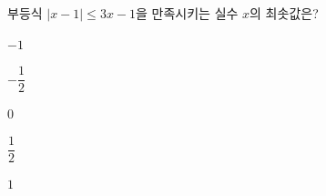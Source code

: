 부등식 $|x-1|\le 3x-1$을 만족시키는 실수 $x$의 최솟값은?
\begin{choices32}{\rule[-3ex]{0pt}{8ex}$-1$}{\rule[-3ex]{0pt}{8ex}$-\dfrac{1}{2}$}{\rule[-3ex]{0pt}{8ex}$0$}{\rule[-3ex]{0pt}{8ex}$\dfrac{1}{2}$}{\rule[-3ex]{0pt}{8ex}$1$}\end{choices32}
